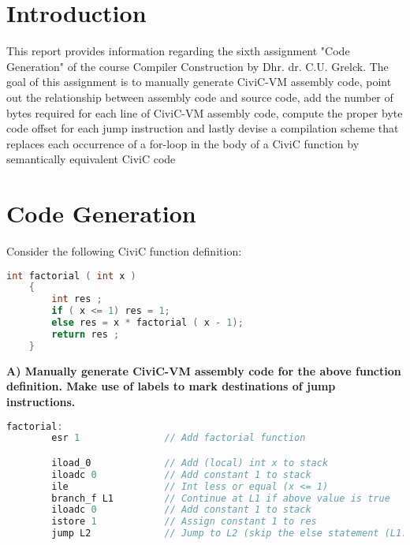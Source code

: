 \documentclass[hidelinks]{uva-inf-article}
\begin{document}
\section{Introduction}
\begin{flushleft}
\par This report provides information regarding the sixth assignment 
"Code Generation" of the course Compiler Construction by Dhr.
dr. C.U. Grelck. The goal of this assignment is to manually generate CiviC-VM 
assembly code, point out the relationship between assembly code and source code,
add the number of bytes required for each line of CiviC-VM assembly code, compute 
the proper byte code offset for each jump instruction and lastly devise a 
compilation scheme that replaces each occurrence of a for-loop in the body of 
a CiviC function by semantically equivalent CiviC code

\newpage
\section{Code Generation}
Consider the following CiviC function definition:
\begin{lstlisting}[basicstyle=\small, language=C, label=lst:code, caption=CiviC function definition, captionpos=b]
    int factorial ( int x )
    {
        int res ;
        if ( x <= 1) res = 1;
        else res = x * factorial ( x - 1);
        return res ;
    }
\end{lstlisting}

\textbf{A) Manually generate CiviC-VM assembly code for the above function definition. Make use of
labels to mark destinations of jump instructions.}

\begin{lstlisting}[basicstyle=\small, language=C, label=lst:code, caption=Assembly code, captionpos=b]
    factorial:    
        esr 1               // Add factorial function

        iload_0             // Add (local) int x to stack
        iloadc 0            // Add constant 1 to stack
        ile                 // Int less or equal (x <= 1)
        branch_f L1         // Continue at L1 if above value is true
        iloadc 0            // Add constant 1 to stack 
        istore 1            // Assign constant 1 to res 
        jump L2             // Jump to L2 (skip the else statement (L1:))


\end{lstlisting}
\end{flushleft}
\end{document}
